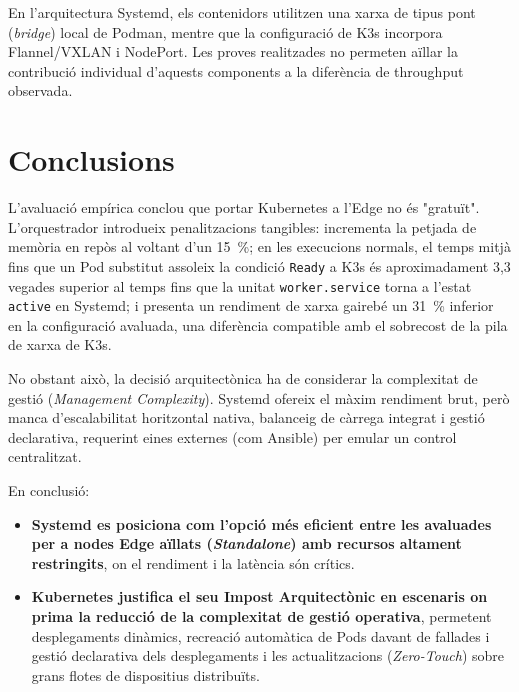 En l'arquitectura Systemd, els contenidors utilitzen una xarxa de tipus pont (\textit{bridge}) local de Podman, mentre que la configuració de K3s incorpora Flannel/VXLAN i NodePort. 
Les proves realitzades no permeten aïllar la contribució individual d'aquests components a la diferència de throughput observada.

\section{Conclusions}
L'avaluació empírica conclou que portar Kubernetes a l'Edge no és "gratuït". 
L'orquestrador introdueix penalitzacions tangibles: incrementa la petjada de memòria en repòs al voltant d'un 15~\%; en les execucions normals, el temps mitjà fins que un Pod substitut assoleix la condició \texttt{Ready} a K3s és aproximadament 3,3 vegades superior al temps fins que la unitat \texttt{worker.service} torna a l'estat \texttt{active} en Systemd; i presenta un rendiment de xarxa gairebé un 31~\% inferior en la configuració avaluada, una diferència compatible amb el sobrecost de la pila de xarxa de K3s.

No obstant això, la decisió arquitectònica ha de considerar la complexitat de gestió (\textit{Management Complexity}). Systemd ofereix el màxim rendiment brut, però manca d'escalabilitat horitzontal nativa, balanceig de càrrega integrat i gestió declarativa, requerint eines externes (com Ansible) per emular un control centralitzat.

En conclusió: 
\begin{itemize}
    \item \textbf{Systemd es posiciona com l'opció més eficient entre les avaluades per a nodes Edge aïllats (\textit{Standalone}) amb recursos altament restringits}, on el rendiment i la latència són crítics.
    \item \textbf{Kubernetes justifica el seu Impost Arquitectònic en escenaris on prima la reducció de la complexitat de gestió operativa}, permetent desplegaments dinàmics, recreació automàtica de Pods davant de fallades i gestió declarativa dels desplegaments i les actualitzacions (\textit{Zero-Touch}) sobre grans flotes de dispositius distribuïts.
\end{itemize}